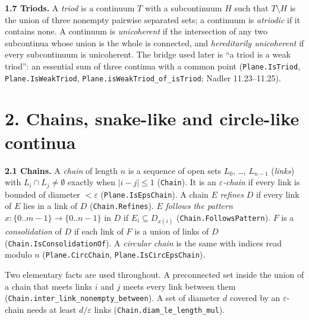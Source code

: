 \documentclass[11pt]{article}
\newcommand{\lean}[1]{\texttt{#1}}
\begin{document}
\textbf{1.7 Triods.} A \emph{triod} is a continuum $T$ with a subcontinuum $H$ such that $T \setminus H$ is the union of three nonempty pairwise separated sets; a continuum is \emph{atriodic} if it contains none. A continuum is \emph{unicoherent} if the intersection of any two subcontinua whose union is the whole is connected, and \emph{hereditarily unicoherent} if every subcontinuum is unicoherent. The bridge used later is ``a triod is a weak triod'': an essential sum of three continua with a common point (\lean{Plane.\hspace{0pt}IsTriod}, \lean{Plane.\hspace{0pt}IsWeakTriod}, \lean{Plane.\hspace{0pt}isWeakTriod\_\hspace{0pt}of\_\hspace{0pt}isTriod}; Nadler 11.23--11.25).

\section*{2. Chains, snake-like and circle-like continua}

\textbf{2.1 Chains.} A \emph{chain} of length $n$ is a sequence of open sets $L_0$, \dots{}, $L_{n-1}$ (\emph{links}) with $L_i \cap L_j \neq \emptyset$ exactly when $|i - j| \leq 1$ (\lean{Chain}). It is an \emph{$\varepsilon$-chain} if every link is bounded of diameter $< \varepsilon$ (\lean{Plane.\hspace{0pt}IsEpsChain}). A chain $E$ \emph{refines} $D$ if every link of $E$ lies in a link of $D$ (\lean{Chain.\hspace{0pt}Refines}). $E$ \emph{follows the pattern} $x : \{0..m-1\} \to \{0..n-1\}$ in $D$ if $E_i \subseteq D_{x(i)}$ (\lean{Chain.\hspace{0pt}FollowsPattern}). $F$ is a \emph{consolidation} of $D$ if each link of $F$ is a union of links of $D$ (\lean{Chain.\hspace{0pt}IsConsolidationOf}). A \emph{circular chain} is the same with indices read modulo $n$ (\lean{Plane.\hspace{0pt}CircChain}, \lean{Plane.\hspace{0pt}IsCircEpsChain}).

Two elementary facts are used throughout. A preconnected set inside the union of a chain that meets links $i$ and $j$ meets every link between them (\lean{Chain.\hspace{0pt}inter\_\hspace{0pt}link\_\hspace{0pt}nonempty\_\hspace{0pt}between}). A set of diameter $d$ covered by an $\varepsilon$-chain needs at least $d/\varepsilon$ links (\lean{Chain.\hspace{0pt}diam\_\hspace{0pt}le\_\hspace{0pt}length\_\hspace{0pt}mul}).
\end{document}
